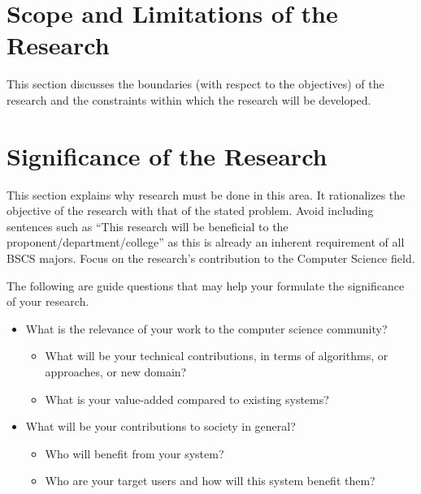 \section{Scope and Limitations of the Research}
\label{sec:scopelimitations}

This section discusses the boundaries (with respect to the objectives) of the research and the constraints within 
which the research will be developed.

\section{Significance of the Research}
\label{sec:significance}

This section explains why research must be done in this area.
 It rationalizes the objective of the research with that of the stated problem. 
 Avoid including sentences such as ``This research will be beneficial to the proponent/department/college'' as this is already an inherent requirement of all BSCS majors.  Focus on the research's contribution to the Computer Science field.

The following are guide questions that may help your formulate the significance of your research. 


%
%
\begin{itemize}
\item  What is the relevance of your work to the computer science community? 

\begin{itemize} 
\item What will be your technical contributions, in terms of algorithms, or approaches, or new domain? 
\item What is your value-added compared to existing systems? 
\end{itemize}

\item What will be your contributions to society in general? 
    \begin{itemize}
      \item Who will benefit from your system? 
      \item Who are your target users and how will this system benefit them? 
   \end{itemize}
\end{itemize}


